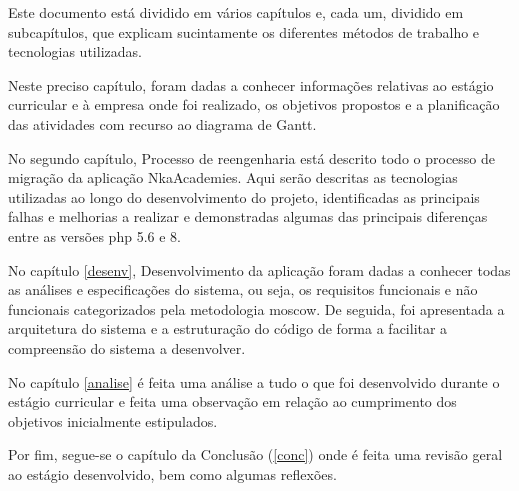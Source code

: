 Este documento está dividido em vários capítulos e, cada um, dividido em subcapítulos, que explicam sucintamente os diferentes métodos de trabalho e tecnologias utilizadas.

Neste preciso capítulo, foram dadas a conhecer informações relativas ao estágio curricular e à empresa onde foi realizado, os objetivos propostos e a planificação das atividades com recurso ao diagrama de Gantt.

No segundo capítulo, Processo de reengenharia está descrito todo o processo de migração da aplicação NkaAcademies. Aqui serão descritas as tecnologias utilizadas ao longo do desenvolvimento do projeto, identificadas as principais falhas e melhorias a realizar e demonstradas algumas das principais diferenças entre as versões \acrshort{php} 5.6 e 8.

No capítulo \ref{desenv}, Desenvolvimento da aplicação foram dadas a conhecer todas as análises e especificações do sistema, ou seja, os requisitos funcionais e não funcionais categorizados pela metodologia \acrshort{moscow}. De seguida, foi apresentada a arquitetura do sistema e a estruturação do código de forma a facilitar a compreensão do sistema a desenvolver.

No capítulo \ref{analise} é feita uma análise a tudo o que foi desenvolvido durante o estágio curricular e feita uma observação em relação ao cumprimento dos objetivos inicialmente estipulados.

Por fim, segue-se o capítulo da Conclusão (\ref{conc}) onde é feita uma revisão geral ao estágio desenvolvido, bem como algumas reflexões.
